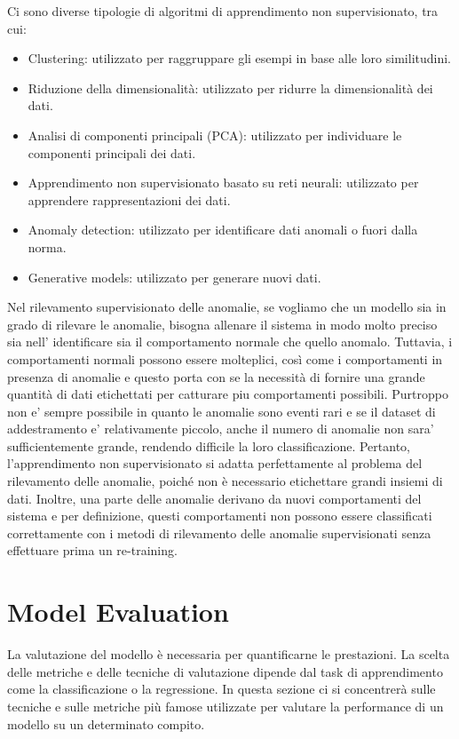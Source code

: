 Ci sono diverse tipologie di algoritmi di apprendimento non supervisionato, tra cui:
\begin{itemize}
\item Clustering: utilizzato per raggruppare gli esempi in base alle loro similitudini.
\item Riduzione della dimensionalità: utilizzato per ridurre la dimensionalità dei dati.
\item Analisi di componenti principali (PCA): utilizzato per individuare le componenti principali dei dati.
\item Apprendimento non supervisionato basato su reti neurali: utilizzato per apprendere rappresentazioni dei dati.
\item Anomaly detection: utilizzato per identificare dati anomali o fuori dalla norma.
\item Generative models: utilizzato per generare nuovi dati.


\end{itemize}
Nel rilevamento supervisionato delle anomalie, se vogliamo che un modello sia in grado di rilevare le anomalie, bisogna allenare il sistema in modo molto preciso sia nell' identificare sia il comportamento normale che quello anomalo.
Tuttavia, i comportamenti normali possono essere molteplici, così come i
comportamenti in presenza di anomalie e questo porta con se la necessità di fornire una grande quantità di dati etichettati per catturare piu comportamenti possibili. Purtroppo non e' sempre possibile in quanto le anomalie sono eventi rari e se il dataset di addestramento e' relativamente piccolo, anche il numero di anomalie non sara' sufficientemente grande, rendendo difficile la loro classificazione. 
Pertanto, l'apprendimento non supervisionato si adatta perfettamente al problema del rilevamento delle anomalie, poiché non è necessario etichettare grandi insiemi di dati. Inoltre, una parte delle anomalie derivano da nuovi comportamenti del sistema e per definizione, questi comportamenti non possono essere classificati correttamente con i metodi di rilevamento delle anomalie supervisionati senza effettuare prima un re-training.


\section{Model Evaluation}
La valutazione del modello è necessaria per quantificarne le prestazioni. La
scelta delle metriche e delle tecniche di valutazione dipende dal task di apprendimento come la classificazione o la regressione. 
In questa sezione ci si concentrerà sulle tecniche e sulle metriche più famose utilizzate per valutare la performance di un modello su un determinato compito.

